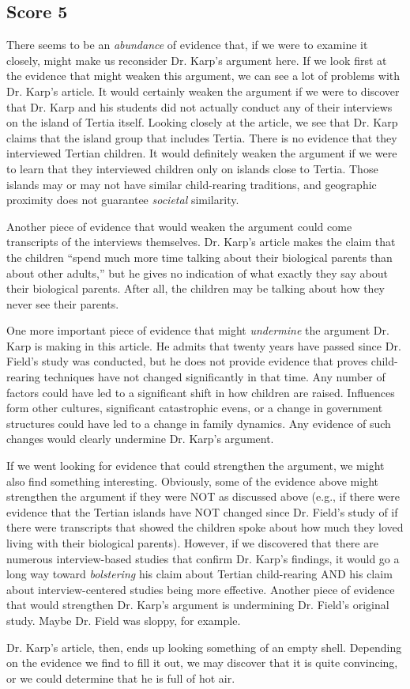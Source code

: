 \subsection{Score 5}
There seems to be an \emph{abundance} of evidence that, if we were to examine it closely, might make us reconsider Dr. Karp's argument here.
If we look first at the evidence that might weaken this argument, we can see a lot of problems with Dr. Karp's article.
It would certainly weaken the argument if we were to discover that Dr. Karp and his students did not actually conduct any of their interviews on the island of Tertia itself.
Looking closely at the article, we see that Dr. Karp claims that the island group that includes Tertia.
There is no evidence that they interviewed Tertian children.
It would definitely weaken the argument if we were to learn that they interviewed children only on islands close to Tertia.
Those islands may or may not have similar child-rearing traditions, and geographic proximity does not guarantee \emph{societal} similarity.

Another piece of evidence that would weaken the argument could come transcripts of the interviews themselves.
Dr. Karp's article makes the claim that the children ``spend much more time talking about their biological parents than about other adults,'' but he gives no indication of what exactly they say about their biological parents.
After all, the children may be talking about how they never see their parents.

One more important piece of evidence that might \emph{undermine} the argument Dr. Karp is making in this article.
He admits that twenty years have passed since Dr. Field's study was conducted, but he does not provide evidence that proves child-rearing techniques have not changed significantly in that time.
Any number of factors could have led to a significant shift in how children are raised.
Influences form other cultures, significant catastrophic evens, or a change in government structures could have led to a change in family dynamics.
Any evidence of such changes would clearly undermine Dr. Karp's argument.

If we went looking for evidence that could strengthen the argument, we might also find something interesting.
Obviously, some of the evidence above might strengthen the argument if they were NOT as discussed above (e.g., if there were evidence that the Tertian islands have NOT changed since Dr. Field's study of if there were transcripts that showed the children spoke about how much they loved living with their biological parents).
However, if we discovered that there are numerous interview-based studies that confirm Dr. Karp's findings, it would go a long way toward \emph{bolstering} his claim about Tertian child-rearing AND his claim about interview-centered studies being more effective.
Another piece of evidence that would strengthen Dr. Karp's argument is undermining Dr. Field's original study.
Maybe Dr. Field was sloppy, for example.

Dr. Karp's article, then, ends up looking something of an empty shell.
Depending on the evidence we find to fill it out, we may discover that it is quite convincing, or we could determine that he is full of hot air.
